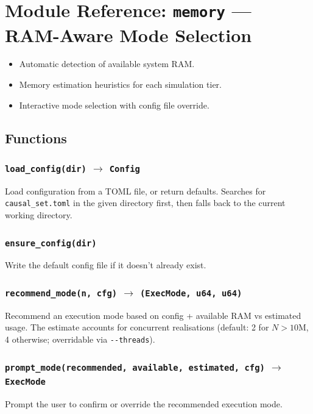 \documentclass[11pt, a4paper, openany]{book}
\newcommand{\code}[1]{\texttt{#1}}
\newcommand{\func}[1]{\texttt{\color{structure}#1}}
\newcommand{\modname}[1]{\texttt{\bfseries\color{main}#1}}
\newenvironment{introduction}[1][Chapter Overview]{%
  \begin{tcolorbox}[
    enhanced,colback=structure!5,colframe=structure,
    colbacktitle=structure,coltitle=white,
    fonttitle=\small\bfseries,title={#1},
    arc=2pt,boxrule=0.7pt,
    left=8pt,right=8pt,top=6pt,bottom=6pt,
    before skip=12pt,after skip=12pt
  ]\itshape\begin{itemize}[leftmargin=*,itemsep=2pt,parsep=0pt]
}{%
  \end{itemize}\end{tcolorbox}
}
\begin{document}
\chapter{Module Reference: \modname{memory} --- RAM-Aware Mode Selection}

\begin{introduction}
  \item Automatic detection of available system RAM.
  \item Memory estimation heuristics for each simulation tier.
  \item Interactive mode selection with config file override.
\end{introduction}

\section{Functions}

\subsection{\func{load\_config(dir)} $\to$ \code{Config}}
Load configuration from a TOML file, or return defaults.  Searches for
\code{causal\_set.toml} in the given directory first, then falls back to the
current working directory.

\subsection{\func{ensure\_config(dir)}}
Write the default config file if it doesn't already exist.

\subsection{\func{recommend\_mode(n, cfg)} $\to$ \code{(ExecMode, u64, u64)}}
Recommend an execution mode based on config + available RAM vs estimated usage.
The estimate accounts for concurrent realisations (default: 2 for $N > 10$M, 4
otherwise; overridable via \code{-{}-threads}).

\subsection{\func{prompt\_mode(recommended, available, estimated, cfg)} $\to$ \code{ExecMode}}
Prompt the user to confirm or override the recommended execution mode.
\end{document}
